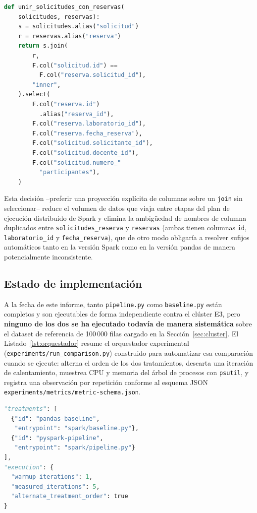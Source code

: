 \documentclass[10pt,twocolumn]{article}
\begin{document}
\begin{lstlisting}[language=Python,caption={Combinación explícita de columnas en \texttt{pipeline.py}.},label={lst:join}]
def unir_solicitudes_con_reservas(
    solicitudes, reservas):
    s = solicitudes.alias("solicitud")
    r = reservas.alias("reserva")
    return s.join(
        r,
        F.col("solicitud.id") ==
          F.col("reserva.solicitud_id"),
        "inner",
    ).select(
        F.col("reserva.id")
          .alias("reserva_id"),
        F.col("reserva.laboratorio_id"),
        F.col("reserva.fecha_reserva"),
        F.col("solicitud.solicitante_id"),
        F.col("solicitud.docente_id"),
        F.col("solicitud.numero_"
          "participantes"),
    )
\end{lstlisting}

Esta decisión --preferir una proyección explícita de columnas sobre un
\texttt{join} sin seleccionar-- reduce el volumen de datos que viaja entre
etapas del plan de ejecución distribuido de Spark y elimina la ambigüedad
de nombres de columna duplicados entre \texttt{solicitudes\_reserva} y
\texttt{reservas} (ambas tienen columnas \texttt{id},
\texttt{laboratorio\_id} y \texttt{fecha\_reserva}), que de otro modo
obligaría a resolver sufijos automáticos tanto en la versión Spark como en
la versión pandas de manera potencialmente inconsistente.

\subsection{Estado de implementación}

A la fecha de este informe, tanto \texttt{pipeline.py} como
\texttt{baseline.py} están completos y son ejecutables de forma
independiente contra el clúster E3, pero \textbf{ninguno de los dos se ha
ejecutado todavía de manera sistemática} sobre el dataset de referencia de
100\,000 filas cargado en la Sección~\ref{sec:cluster}. El
Listado~\ref{lst:orquestador} resume el orquestador experimental
(\texttt{experiments/run\_comparison.py}) construido para automatizar esa
comparación cuando se ejecute: alterna el orden de los dos tratamientos,
descarta una iteración de calentamiento, muestrea CPU y memoria del árbol
de procesos con \texttt{psutil}, y registra una observación por repetición
conforme al esquema JSON \texttt{experiments/metrics/metric-schema.json}.

\begin{lstlisting}[language=Python,caption={Firma de los tratamientos configurados en \texttt{experiment-config.json}.},label={lst:orquestador}]
"treatments": [
  {"id": "pandas-baseline",
   "entrypoint": "spark/baseline.py"},
  {"id": "pyspark-pipeline",
   "entrypoint": "spark/pipeline.py"}
],
"execution": {
  "warmup_iterations": 1,
  "measured_iterations": 5,
  "alternate_treatment_order": true
}
\end{lstlisting}
\end{document}
